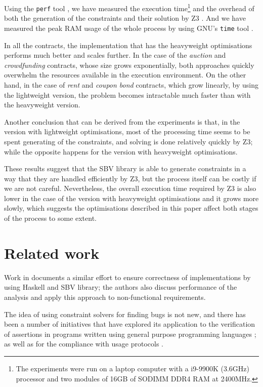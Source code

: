 \documentclass[english,runningheads]{llncs}
\begin{document}
Using the \texttt{perf} tool \cite{perf}, we have measured the execution
time\footnote{The experiments were run on a laptop computer with a
i9-9900K (3.6GHz) processor and two modules of 16GB of SODIMM DDR4 RAM at 2400MHz.}
and the overhead of both the generation of the constraints and their solution
by Z3 \cite{de2008z3}. And we have measured the peak RAM usage of the whole
process by using GNU's \texttt{time} tool \cite{keppel1998gnu}.

In all the contracts, the implementation that has the heavyweight optimisations
performs much better and scales further. In the case of the \textit{auction}
and \textit{crowdfunding} contracts, whose size grows exponentially, both
approaches quickly overwhelm the resources available in the execution environment.
On the other hand, in the case of \textit{rent} and \textit{coupon bond} contracts,
which grow linearly, by using the lightweight version, the problem becomes 
intractable much faster than with the heavyweight version.

Another conclusion that can be derived from the experiments is that, in the
version with lightweight optimisations, most of the processing time seems to be
spent generating of the constraints, and solving is done relatively
quickly by Z3; while the opposite happens for the version with heavyweight
optimisations.

These results suggest that the SBV library is able to generate constraints in a way
that they are handled efficiently by Z3, but the process itself can be costly
if we are not careful. Nevertheless, the overall execution time required by Z3
is also lower in the case of the version with heavyweight optimisations and it
grows more slowly, which suggests the optimisations described in this paper
affect both stages of the process to some extent.

\section{Related work}

Work in \cite{mokhov2019formal} documents a similar effort to ensure
correctness of implementations by using Haskell and SBV library; the
authors also discuss performance of the analysis and apply this approach
to non-functional requirements.

The idea of using constraint solvers for finding bugs is not new,
and there has been a number of initiatives that have explored its
application to the verification of assertions in programs written
using general purpose programming languages \cite{gulwani2008program,jackson2000finding};
as well as for the compliance with usage protocols
\cite{ball2001automatically,xie2005saturn}.
\end{document}
